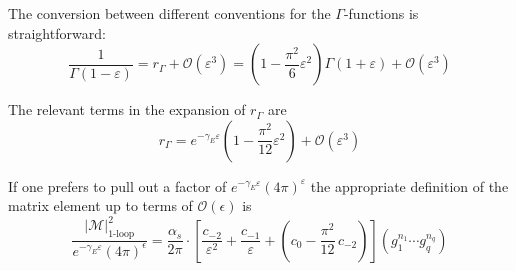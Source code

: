 \documentclass[11pt,a4paper]{refrep}
\begin{document}
The conversion between different conventions for the $\Gamma$-functions
is straightforward:
\begin{equation}
\frac{1}{\Gamma(1-\varepsilon)}=r_\Gamma+{\mathcal O}(\varepsilon^3)=
\left(1-\frac{\pi^2}{6}\varepsilon^2\right)\Gamma(1+\varepsilon)
   +{\mathcal O}(\varepsilon^3)
\end{equation}

The relevant terms in the expansion of $r_\Gamma$ are
\begin{equation}
r_\Gamma=e^{-\gamma_E\varepsilon}
\left(1-\frac{\pi^2}{12}\varepsilon^2\right)+\mathcal{O}(\varepsilon^3)
\end{equation}

If one prefers to pull out a factor of
$e^{-\gamma_E\varepsilon}(4\pi)^{\varepsilon}$ the appropriate
definition of the matrix element up to terms of $\mathcal{O}(\epsilon)$ is
\begin{equation}
\frac{\left\vert\mathcal{M}\right\vert^2_{\text{1-loop}}}%
{e^{-\gamma_E\varepsilon}(4\pi)^\epsilon}=
\frac{\alpha_s}{2\pi}
\cdot\left[\frac{c_{-2}}{\varepsilon^2}+\frac{c_{-1}}{\varepsilon}
+\left(c_0-\frac{\pi^2}{12}\,c_{-2}\right)
\right](g_1^{n_1}\cdots g_q^{n_q})
\end{equation}

\end{document}
